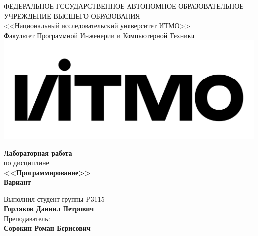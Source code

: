 \begin{titlepage}
\thispagestyle{firststyle}
\begin{center}
    ФЕДЕРАЛЬНОЕ ГОСУДАРСТВЕННОЕ АВТОНОМНОЕ ОБРАЗОВАТЕЛЬНОЕ УЧРЕЖДЕНИЕ ВЫСШЕГО ОБРАЗОВАНИЯ\\
    \vspace{0.5cm}
<<Национальный исследовательский университет ИТМО>>\\
Факультет Программной Инженерии и Компьютерной Техники \\
\vspace{1cm}
    \includegraphics[scale=0.1]{img/itmo_logo.png}
\end{center}

\vspace{1cm}

\begin{center}
    \large
    \textbf{Лабораторная работа }\\
    по дисциплине\\
    \textbf{<<Программирование>>} \\
     \textbf{Вариант }
\end{center}

\vspace{12cm}

\begin{flushright}
  Выполнил студент  группы P3115\\
  \textbf{Горляков Даниил Петрович} \\
  Преподаватель: \\
  \textbf{Сорокин Роман Борисович}\\
\end{flushright}

\end{titlepage}